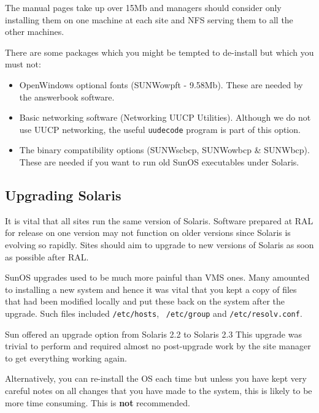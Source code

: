 The manual pages take up over 15Mb and managers should consider only installing 
them on one machine at each site and NFS serving them to all the other
machines.

There are some packages which you might be tempted to de-install but which
you must not:

\begin{itemize}

\item OpenWindows optional fonts (SUNWowpft - 9.58Mb). 
These are needed by the answerbook software. 

\item Basic networking software (Networking UUCP Utilities).
Although we do not use UUCP networking, the useful \verb+uudecode+ program
is part of this option. 

\item The binary compatibility options (SUNWscbcp, SUNWowbcp \& SUNWbcp). These
are needed if you want to run old SunOS executables under Solaris. 

\end{itemize}
                                                         
\subsection {Upgrading Solaris}

It is vital that all sites run the same version of Solaris. Software prepared
at RAL for release on one version may not function on older versions
since Solaris is evolving so rapidly. 
Sites should aim to upgrade to new versions of Solaris as soon as
possible after RAL.

SunOS upgrades used to be much more painful than VMS ones. 
Many amounted to installing a new system  and hence it was vital that you kept
a copy of files that had  been modified locally and put these back on the
system after the upgrade. Such files included {\tt /etc/hosts}, {\tt
/etc/group} and {\tt /etc/resolv.conf}. 

Sun offered an upgrade option from Solaris 2.2 to Solaris 2.3 
This upgrade was trivial to perform  and required almost no 
post-upgrade work by the site manager to get everything working again. 

Alternatively, you can re-install the OS each time but unless you have
kept very careful notes on all changes that you have made to the system,
this is likely to be more time consuming. This is {\bf not} recommended.

